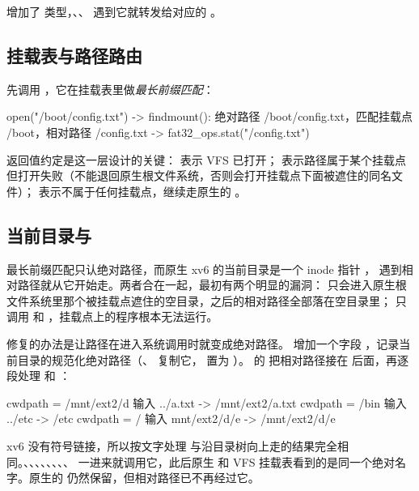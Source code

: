  增加了  类型，、、 遇到它就转发给对应的 。

\subsection{挂载表与路径路由}

 先调用 ，它在挂载表里做\emph{最长前缀匹配}：

\begin{txtcode}
open("/boot/config.txt")
  -> findmount(): 绝对路径 /boot/config.txt，匹配挂载点 /boot，相对路径 /config.txt
  -> fat32_ops.stat("/config.txt")
\end{txtcode}

返回值约定是这一层设计的关键： 表示 VFS 已打开； 表示路径属于某个挂载点但打开失败（不能退回原生根文件系统，否则会打开挂载点下面被遮住的同名文件）； 表示不属于任何挂载点，继续走原生的 。

\subsection{当前目录与 }
\label{sec:vfs-cwd}

最长前缀匹配只认绝对路径，而原生 xv6 的当前目录是一个 inode 指针 ， 遇到相对路径就从它开始走。两者合在一起，最初有两个明显的漏洞： 只会进入原生根文件系统里那个被挂载点遮住的空目录，之后的相对路径全部落在空目录里； 只调用  和 ，挂载点上的程序根本无法运行。

修复的办法是让路径在进入系统调用时就变成绝对路径。 增加一个字段 ，记录当前目录的规范化绝对路径（、 复制它， 置为 \code{/}）。 的  把相对路径接在  后面，再逐段处理  和 ：

\begin{txtcode}
cwdpath = /mnt/ext2/d      输入 ../a.txt     ->  /mnt/ext2/a.txt
cwdpath = /bin             输入 ../etc       ->  /etc
cwdpath = /                输入 mnt/ext2/d/e ->  /mnt/ext2/d/e
\end{txtcode}

xv6 没有符号链接，所以按文字处理  与沿目录树向上走的结果完全相同。、、、、、、、、 一进来就调用它，此后原生  和 VFS 挂载表看到的是同一个绝对名字。原生的  仍然保留，但相对路径已不再经过它。

